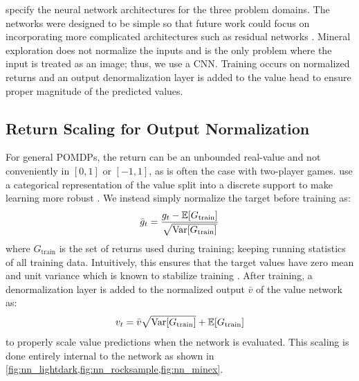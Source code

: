  specify the neural network architectures for the three problem domains.
The networks were designed to be simple so that future work could focus on incorporating more complicated architectures such as residual networks \cite{vinyals2019grandmaster,sherstinsky2020fundamentals}.
Mineral exploration does not normalize the inputs and is the only problem where the input is treated as an image; thus, we use a CNN.
Training occurs on normalized returns and an output denormalization layer is added to the value head to ensure proper magnitude of the predicted values.


\subsection{Return Scaling for Output Normalization}

For general POMDPs, the return can be an unbounded real-value and not conveniently in $[0,1]$ or $[-1,1]$, as is often the case with two-player games. 
\textcite{schrittwieser2020mastering} use a categorical representation of the value split into a discrete support to make learning more robust \cite{schrittwieser2020intuition}.
We instead simply normalize the target before training as:
\begin{equation}
    \bar{g}_t = \frac{g_t - \mathbb{E}[G_\text{train}]}{\sqrt{\operatorname{Var}[G_\text{train}]}}
\end{equation}
where $G_\text{train}$ is the set of returns used during training; keeping running statistics of all training data.
Intuitively, this ensures that the target values have zero mean and unit variance which is known to stabilize training \cite{lecun2002efficient}.
After training, a denormalization layer is added to the normalized output $\bar{v}$ of the value network as:
\begin{equation}
    v_t = \bar{v} \sqrt{\operatorname{Var}[G_\text{train}]} + \mathbb{E}[G_\text{train}]
\end{equation}
to properly scale value predictions when the network is evaluated.
This scaling is done entirely internal to the network as shown in \cref{fig:nn_lightdark,fig:nn_rocksample,fig:nn_minex}.


